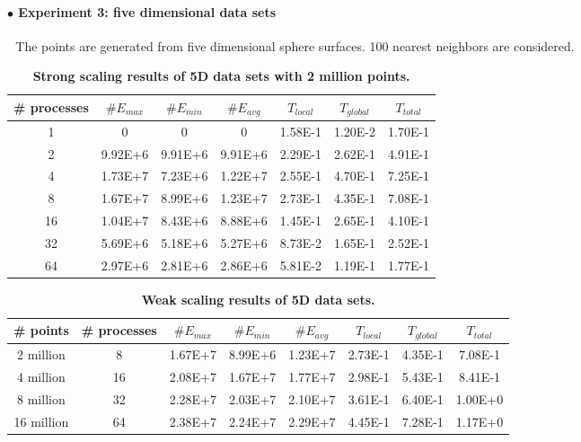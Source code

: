 \documentclass[12pt]{article}
\begin{document}
\paragraph{$\bullet$ Experiment 3: five dimensional data sets}
$ $\newline
$ $\newline
\indent The points are generated from five dimensional sphere surfaces. 100 nearest neighbors are considered.
$ $\newline
\renewcommand{\arraystretch}{1.7}
\begin{table}[h]
\centering
    \caption{\textbf{Strong scaling results of 5D data sets with 2 million points.} }
	\label{2M5D}
\begin{tabular}{ccccccc}
    \hline %
\# processes  &$\# E_{max}$   &$\# E_{min}$ &$\# E_{avg}$  &$T_{local}$  &$T_{global}$  &$T_{total}$\\
\hline\hline
1   &0   &0     &0   &1.58E-1    &1.20E-2    &1.70E-1 \\
2   &9.92E+6    &9.91E+6    &9.91E+6    &2.29E-1    &2.62E-1    &4.91E-1\\
4   &1.73E+7    &7.23E+6    &1.22E+7    &2.55E-1    &4.70E-1    &7.25E-1\\
8   &1.67E+7    &8.99E+6    &1.23E+7    &2.73E-1    &4.35E-1    &7.08E-1\\
16  &1.04E+7    &8.43E+6    &8.88E+6    &1.45E-1    &2.65E-1    &4.10E-1\\
32  &5.69E+6    &5.18E+6    &5.27E+6    &8.73E-2    &1.65E-1    &2.52E-1\\
64  &2.97E+6    &2.81E+6    &2.86E+6    &5.81E-2    &1.19E-1    &1.77E-1\\
\hline
    \end{tabular}
\end{table}

\renewcommand{\arraystretch}{1.7}
\begin{table}[h]
\centering
    \caption{\textbf{Weak scaling results of 5D data sets.} }
	\label{5Dweak}
\begin{tabular}{cccccccc}
    \hline %
\# points &\# processes  &$\# E_{max}$   &$\# E_{min}$ &$\# E_{avg}$  &$T_{local}$  &$T_{global}$  &$T_{total}$\\
\hline\hline
2 million  &8   &1.67E+7    &8.99E+6    &1.23E+7    &2.73E-1    &4.35E-1    &7.08E-1\\
4 million  &16  &2.08E+7    &1.67E+7    &1.77E+7    &2.98E-1    &5.43E-1    &8.41E-1\\
8 million  &32  &2.28E+7    &2.03E+7    &2.10E+7    &3.61E-1    &6.40E-1    &1.00E+0\\
16 million &64  &2.38E+7    &2.24E+7    &2.29E+7    &4.45E-1    &7.28E-1    &1.17E+0\\



\hline
    \end{tabular}
\end{table}
\end{document}
